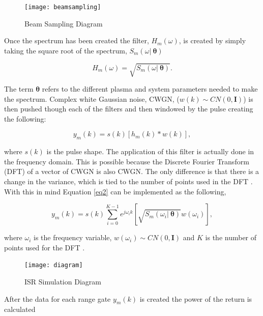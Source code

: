 \documentclass[10pt]{report}
\begin{document}
\begin{figure}[!t]
\centering
\texttt{[image: beamsampling]}
\caption{Beam Sampling Diagram}
\label{fig:beamdia}
\end{figure}

Once the spectrum has been created the filter, $H_m(\omega)$, is created by simply taking the square root of the spectrum, $S_m(\omega | \: \bm{\theta})$

\begin{equation}
\label{eq1}
H_m(\omega) = \sqrt{S_m(\omega | \: \bm{\theta})}.
\end{equation}

\noindent The term $ \bm{\theta}$ refers to the different plasma and system parameters needed to make the spectrum. Complex white Gaussian noise, CWGN, ($w(k)\sim CN(0,\mathbf{I})$) is then pushed though each of the filters and then windowed by the pulse creating the following:   

\begin{equation}
\label{eq2}
y_m (k)= s(k)\left[h_m(k)*w(k)\right],
\end{equation}
 
\noindent where $s(k)$ is the pulse shape. The application of this filter is actually done in the frequency domain. This is possible because the Discrete Fourier Transform (DFT) of a vector of CWGN is also CWGN. The only difference is that there is a change in the variance, which is tied to the number of points used in the DFT \cite{kayvol1}. With this in mind Equation \ref{eq2} can be implemented as the following,

\begin{equation}
\label{eq:fftfilt}
y_m (k)= s(k)\displaystyle \sum_{i=0}^{K-1}e^{j\omega_ik}\left[ \sqrt{S_m(\omega_i | \: \bm{\theta})}w(\omega_i)\right],
\end{equation}

\noindent where $\omega_i$ is the frequency variable, $w(\omega_i) \sim CN(0,\mathbf{I})$ and $K$ is the number of points used for the DFT \cite{michellnoisesim1981}.

\begin{figure}[!h]
\centering
\texttt{[image: diagram]}
\caption{ISR Simulation Diagram}
\label{fig:isrdiag}
\end{figure}


After the data for each range gate $y_m(k)$ is created the power of the return is calculated
\end{document}
